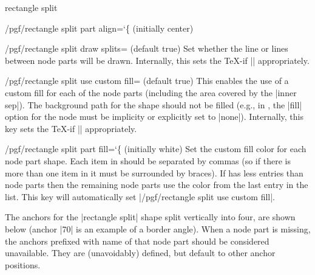 \begin{shape}{rectangle split}
\begin{key}{/pgf/rectangle split part align={\ttfamily\char`\{} (initially center)}
  \end{key}

  \begin{key}{/pgf/rectangle split draw splits= (default true)}
  	Set whether the line or lines between node parts will be drawn.
  	Internally, this sets the \TeX-if |\ifpgfrectanglesplitdrawsplits|
  	appropriately.
  \end{key}

  \begin{key}{/pgf/rectangle split use custom fill= (default true)}
    This enables the use of a custom fill for each of the node
    parts (including the area covered by the |inner sep|). The
    background path for the shape should not be filled (e.g., in
    \tikzname{}, the |fill|
    option for the node must be implicity or explicitly set to |none|).
    Internally, this key sets the \TeX-if
    |\ifpgfrectanglesplitusecustomfill| appropriately.
  \end{key}

  \begin{key}{/pgf/rectangle split part fill={\ttfamily\char`\{} (initially white)}
  	Set the custom fill color for each node part shape.
  	Each item in  should be separated by commas (so if
  	there is more than one item in  it must be surrounded
  	by braces).
  	If   has less entries than node
    parts then the remaining node parts use the color from
    the last entry in the list. This key will automatically set
    |/pgf/rectangle split use custom fill|.

\begin{codeexample}[]
\end{codeexample}

\end{key}
	
  The anchors for the |rectangle split| shape split vertically into four,
  are shown below (anchor |70| is an example of a border angle). When a
  node part is missing, the anchors prefixed with name of that node part
  should be considered unavailable. They are (unavoidably) defined, but
  default to other anchor positions.


\end{shape}
